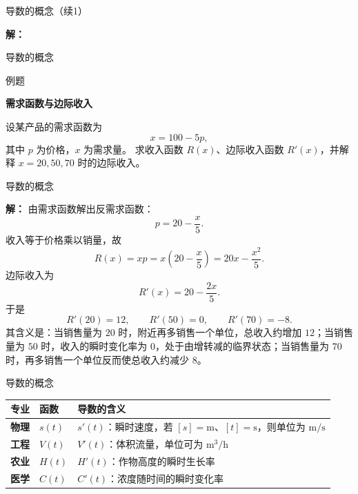 \documentclass[aspectratio=169,10pt,fontset=fandol]{ctexbeamer}
\begin{document}
\begin{frame}[t,fragile]{导数的概念（续1）}
\footnotesize
{\footnotesize
\textbf{解：}


}
\end{frame}
\begin{frame}[t,fragile]{导数的概念}
\footnotesize
\begin{block}{例题}
{\footnotesize
\textbf{需求函数与边际收入}\par

设某产品的需求函数为
\[
x=100-5p,
\]
其中 $p$ 为价格，$x$ 为需求量。 求收入函数 $R(x)$、边际收入函数 $R'(x)$，并解释 $x=20,50,70$ 时的边际收入。

}
\end{block}
\end{frame}
\begin{frame}[t,fragile]{导数的概念}
\footnotesize
{\footnotesize
\textbf{解：}
由需求函数解出反需求函数：
\[
p=20-\frac{x}{5}.
\]
收入等于价格乘以销量，故
\[
R(x)=xp=x\left(20-\frac{x}{5}\right)=20x-\frac{x^2}{5}.
\]
边际收入为
\[
R'(x)=20-\frac{2x}{5}.
\]
于是
\[
R'(20)=12,\qquad R'(50)=0,\qquad R'(70)=-8.
\]
其含义是：当销售量为 $20$ 时，附近再多销售一个单位，总收入约增加 $12$；当销售量为 $50$ 时，收入的瞬时变化率为 $0$，处于由增转减的临界状态；当销售量为 $70$ 时，再多销售一个单位反而使总收入约减少 $8$。

}
\end{frame}
\begin{frame}[t,fragile]{导数的概念}
\footnotesize
{\footnotesize
\begin{center}
\small
\begin{tabularx}{\textwidth}{>{\bfseries}p{1.4cm} p{2.0cm} X}
\toprule
专业 & 函数 & 导数的含义 \\
\midrule
物理 & $s(t)$ & $s'(t)$：瞬时速度，若 $[s]=\mathrm m$、$[t]=\mathrm s$，则单位为 $\mathrm{m/s}$ \\
工程 & $V(t)$ & $V'(t)$：体积流量，单位可为 $\mathrm{m^3/h}$ \\
农业 & $H(t)$ & $H'(t)$：作物高度的瞬时生长率 \\
医学 & $C(t)$ & $C'(t)$：浓度随时间的瞬时变化率 \\
\bottomrule
\end{tabularx}
\end{center}
}
\end{frame}
\end{document}

